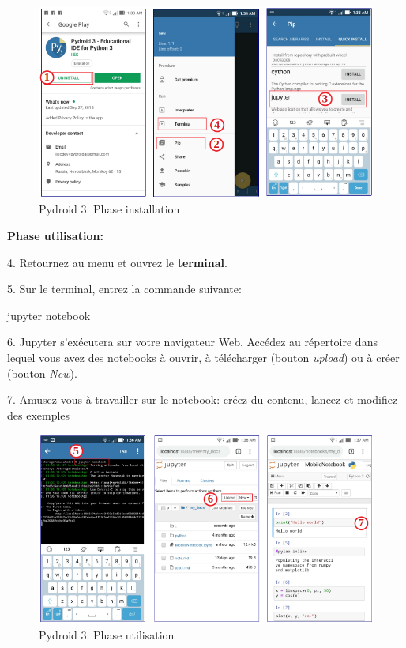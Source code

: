 \documentclass[%
oneside,                 %
final,                   %
10pt]{article}
\begin{document}
\begin{figure}[!ht]  %
  \centerline{\includegraphics[width=0.7\linewidth]{figs/pydroid3_1.png}}
  \caption{
  Pydroid 3: Phase installation
  }
\end{figure}


\textbf{Phase utilisation:}

4. Retournez au menu et ouvrez le \textbf{terminal}.

5. Sur le terminal, entrez la commande suivante:

\bsys
jupyter notebook
\esys

6. Jupyter s'exécutera sur votre navigateur Web. Accédez au répertoire dans lequel vous avez des notebooks à ouvrir, à télécharger (bouton \emph{upload}) ou à créer (bouton \emph{New}).

7. Amusez-vous à travailler sur le notebook: créez du contenu, lancez et modifiez des exemples


\begin{figure}[!ht]  %
  \centerline{\includegraphics[width=0.7\linewidth]{figs/pydroid3_2.png}}
  \caption{
  Pydroid 3: Phase utilisation
  }
\end{figure}


\end{document}
